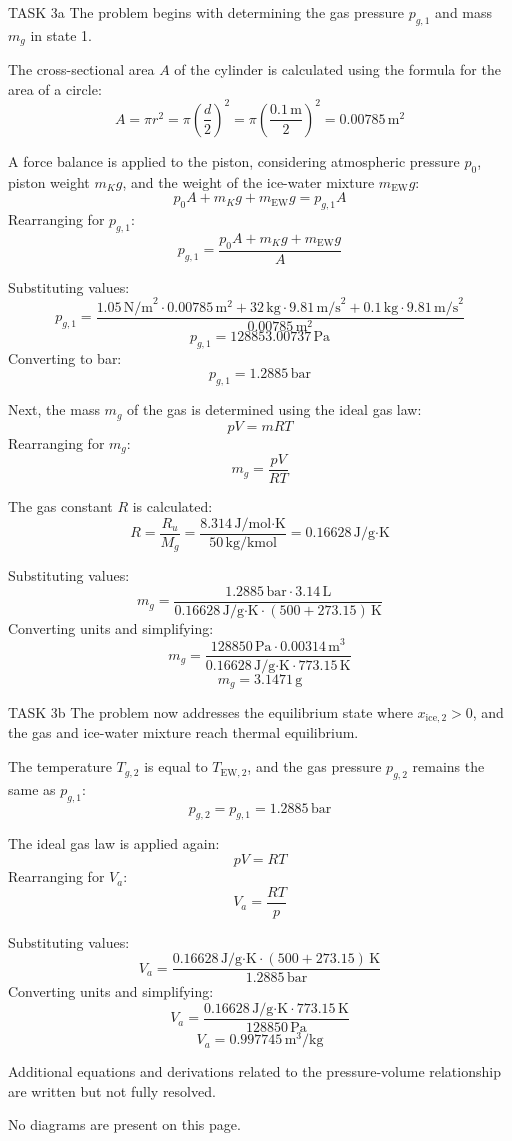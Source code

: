 TASK 3a  
The problem begins with determining the gas pressure \( p_{g,1} \) and mass \( m_g \) in state 1.  

The cross-sectional area \( A \) of the cylinder is calculated using the formula for the area of a circle:  
\[
A = \pi r^2 = \pi \left(\frac{d}{2}\right)^2 = \pi \left(\frac{0.1 \, \text{m}}{2}\right)^2 = 0.00785 \, \text{m}^2
\]  

A force balance is applied to the piston, considering atmospheric pressure \( p_0 \), piston weight \( m_K g \), and the weight of the ice-water mixture \( m_{\text{EW}} g \):  
\[
p_0 A + m_K g + m_{\text{EW}} g = p_{g,1} A
\]  
Rearranging for \( p_{g,1} \):  
\[
p_{g,1} = \frac{p_0 A + m_K g + m_{\text{EW}} g}{A}
\]  

Substituting values:  
\[
p_{g,1} = \frac{1.05 \, \text{N/m}^2 \cdot 0.00785 \, \text{m}^2 + 32 \, \text{kg} \cdot 9.81 \, \text{m/s}^2 + 0.1 \, \text{kg} \cdot 9.81 \, \text{m/s}^2}{0.00785 \, \text{m}^2}
\]  
\[
p_{g,1} = 128853.00737 \, \text{Pa}
\]  
Converting to bar:  
\[
p_{g,1} = 1.2885 \, \text{bar}
\]  

Next, the mass \( m_g \) of the gas is determined using the ideal gas law:  
\[
p V = m R T
\]  
Rearranging for \( m_g \):  
\[
m_g = \frac{p V}{R T}
\]  

The gas constant \( R \) is calculated:  
\[
R = \frac{R_u}{M_g} = \frac{8.314 \, \text{J/mol·K}}{50 \, \text{kg/kmol}} = 0.16628 \, \text{J/g·K}
\]  

Substituting values:  
\[
m_g = \frac{1.2885 \, \text{bar} \cdot 3.14 \, \text{L}}{0.16628 \, \text{J/g·K} \cdot (500 + 273.15) \, \text{K}}
\]  
Converting units and simplifying:  
\[
m_g = \frac{128850 \, \text{Pa} \cdot 0.00314 \, \text{m}^3}{0.16628 \, \text{J/g·K} \cdot 773.15 \, \text{K}}
\]  
\[
m_g = 3.1471 \, \text{g}
\]  

TASK 3b  
The problem now addresses the equilibrium state where \( x_{\text{ice},2} > 0 \), and the gas and ice-water mixture reach thermal equilibrium.  

The temperature \( T_{g,2} \) is equal to \( T_{\text{EW},2} \), and the gas pressure \( p_{g,2} \) remains the same as \( p_{g,1} \):  
\[
p_{g,2} = p_{g,1} = 1.2885 \, \text{bar}
\]  

The ideal gas law is applied again:  
\[
p V = R T
\]  
Rearranging for \( V_a \):  
\[
V_a = \frac{R T}{p}
\]  

Substituting values:  
\[
V_a = \frac{0.16628 \, \text{J/g·K} \cdot (500 + 273.15) \, \text{K}}{1.2885 \, \text{bar}}
\]  
Converting units and simplifying:  
\[
V_a = \frac{0.16628 \, \text{J/g·K} \cdot 773.15 \, \text{K}}{128850 \, \text{Pa}}
\]  
\[
V_a = 0.997745 \, \text{m}^3/\text{kg}
\]  

Additional equations and derivations related to the pressure-volume relationship are written but not fully resolved.  

No diagrams are present on this page.